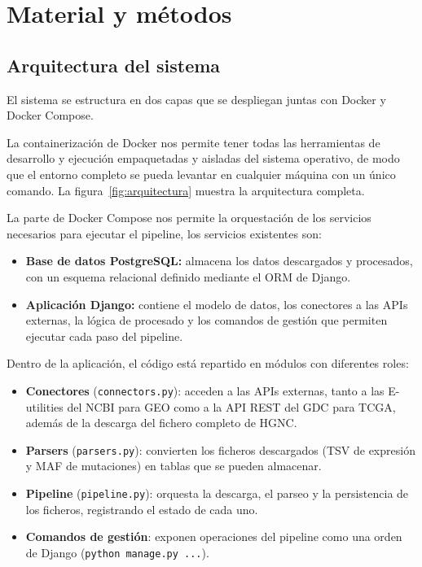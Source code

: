 \documentclass[12pt, a4paper]{report}
\begin{document}

\chapter{Material y métodos}

\section{Arquitectura del sistema}

El sistema se estructura en dos capas que se despliegan juntas con Docker y Docker Compose.

La containerización de Docker nos permite tener todas las herramientas de desarrollo y ejecución empaquetadas y aisladas del sistema operativo, de modo que el entorno completo se pueda levantar en cualquier máquina con un único comando. La figura~\ref{fig:arquitectura} muestra la arquitectura completa.

La parte de Docker Compose nos permite la orquestación de los servicios necesarios para ejecutar el pipeline, los servicios existentes son:

\begin{itemize}
  \item \textbf{Base de datos PostgreSQL:} almacena los datos descargados y procesados, con un esquema relacional definido mediante el ORM de Django.
  \item \textbf{Aplicación Django:} contiene el modelo de datos, los conectores a las APIs externas, la lógica de procesado y los comandos de gestión que permiten ejecutar cada paso del pipeline.
\end{itemize}

Dentro de la aplicación, el código está repartido en módulos con diferentes roles:

\begin{itemize}
  \item \textbf{Conectores} (\texttt{connectors.py}): acceden a las APIs externas, tanto a las E-utilities del NCBI para GEO como a la API REST del GDC para TCGA, además de la descarga del fichero completo de HGNC.
  \item \textbf{Parsers} (\texttt{parsers.py}): convierten los ficheros descargados (TSV de expresión y MAF de mutaciones) en tablas que se pueden almacenar.
  \item \textbf{Pipeline} (\texttt{pipeline.py}): orquesta la descarga, el parseo y la persistencia de los ficheros, registrando el estado de cada uno.
  \item \textbf{Comandos de gestión}: exponen operaciones del pipeline como una orden de Django (\texttt{python manage.py ...}).
\end{itemize}
\end{document}
